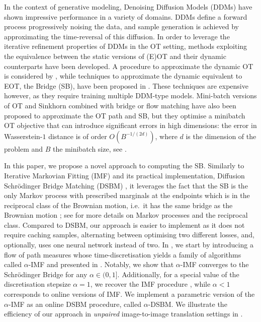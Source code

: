 \documentclass{article}
\begin{document}
In the context of generative modeling,  Denoising Diffusion Models (DDMs) \citep{song_denoising_2021,ho_denoising_2020} have shown impressive performance in a variety of domains. DDMs define a forward process progressively noising the data, and sample generation is achieved by approximating the time-reversal of this diffusion. In order to leverage the iterative refinement properties of DDMs in the OT setting, methods exploiting the equivalence between the static versions of (E)OT and their dynamic counterparts \citep{benamou2000computational,leonard2014survey} have been developed. A procedure to approximate the dynamic OT is considered by \cite{liu_flow_2023}, while techniques to approximate the dynamic equivalent to EOT, the \schro Bridge (SB), have been proposed in \citep{debortoli2021diffusion,vargas2021solving,chen2021likelihood,peluchetti_diffusion_2023,shi2023DSBM}. These techniques are expensive however, as they require training multiple DDM-type models. Mini-batch versions of OT and Sinkhorn \citep{pooladian_2023_multisample,tong2024simulationfree} combined with bridge or flow matching have also been proposed to approximate the OT path and SB, but they optimise a minibatch OT objective that can introduce significant errors in high dimensions: the error in Wasserstein-$1$ distance is of order $O(B^{-1/(2d)})$, where $d$ is the dimension of the problem and $B$ the minibatch size, see \citep[Corollary 1]{sommerfeld2019optimal}.

In this paper, we propose a novel approach to computing the SB. Similarly to Iterative Markovian Fitting (IMF) and its practical implementation, Diffusion Schr\"odinger Bridge Matching (DSBM) \citep{shi2023DSBM,peluchetti_diffusion_2023}, it leverages the fact that the SB is the only Markov process with prescribed marginals at the endpoints which is in the reciprocal class of the Brownian motion, i.e.~it has the same bridge as the Brownian motion \citep{leonard2014survey}; see  for more details on Markov processes and the reciprocal class. Compared to DSBM, our approach is easier to implement as it does not require caching samples, alternating between optimising two different losses, and, optionally, uses one neural network instead of two. In , we start by introducing a flow of path measures whose time-discretisation yields a family of algorithms called $\alpha$-IMF and presented in . Notably, we show that $\alpha$-IMF converges to the Schr\"odinger Bridge for any $\alpha \in (0,1]$.  Additionally, for a special value of the discretisation stepsize $\alpha = 1$, we recover the IMF procedure \citep{peluchetti_diffusion_2023,shi2023DSBM}, while $\alpha < 1$ corresponds to online versions of IMF. We implement a parametric version of the $\alpha$-IMF as an online DSBM procedure, called $\alpha$-DSBM. 
We illustrate the efficiency of our approach in \emph{unpaired} image-to-image translation settings in . 
\end{document}
